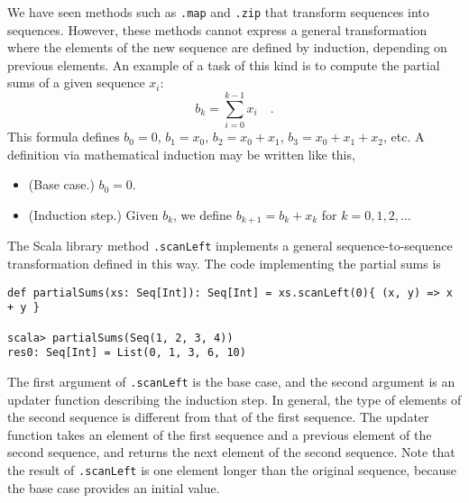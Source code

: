 We have seen methods such as \lstinline!.map!
and \lstinline!.zip! that
transform sequences into sequences. However, these methods cannot
express a general transformation where the elements of the new sequence
are defined by induction, depending on previous elements. An example
of a task of this kind is to compute the partial sums of a given sequence
$x_{i}$: 
\[
b_{k}=\sum_{i=0}^{k-1}x_{i}\quad.
\]
This formula defines $b_{0}=0$, $b_{1}=x_{0}$, $b_{2}=x_{0}+x_{1}$,
$b_{3}=x_{0}+x_{1}+x_{2}$, etc. A definition via mathematical induction
may be written like this,
\begin{itemize}
\item (Base case.) $b_{0}=0$.
\item (Induction step.) Given $b_{k}$, we define $b_{k+1}=b_{k}+x_{k}$
for $k=0,1,2,...$
\end{itemize}
The Scala library method \lstinline!.scanLeft!
implements a general sequence-to-sequence transformation defined in
this way. The code implementing the partial sums is
\begin{lstlisting}
def partialSums(xs: Seq[Int]): Seq[Int] = xs.scanLeft(0){ (x, y) => x + y }

scala> partialSums(Seq(1, 2, 3, 4))
res0: Seq[Int] = List(0, 1, 3, 6, 10)
\end{lstlisting}
The first argument of \lstinline!.scanLeft!
is the base case, and the second argument is an updater function describing
the induction step. In general, the type of elements of the second
sequence is different from that of the first sequence. The updater
function takes an element of the first sequence and a previous element
of the second sequence, and returns the next element of the second
sequence. Note that the result of \lstinline!.scanLeft!
is one element longer than the original sequence, because the base
case provides an initial value.

